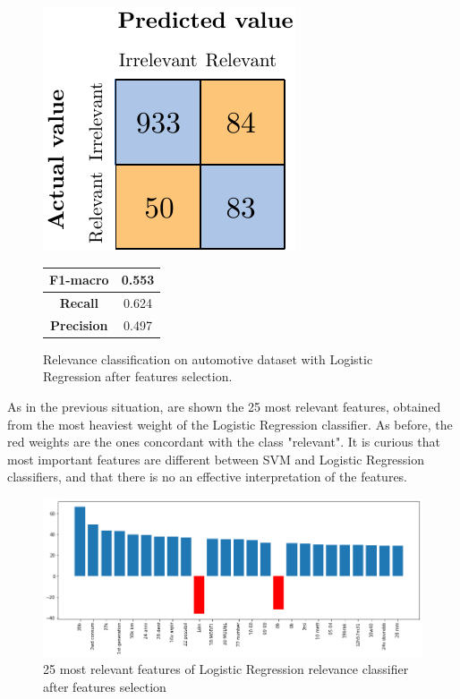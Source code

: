 \begin{figure}[H]
	\begin{minipage}[b]{0.6\linewidth}
		\centering
		\includegraphics[scale=1]{figures/conf_matrices/ita_rel_logreg/ita_rel_logreg_afs.pdf}
	\end{minipage}
	\begin{minipage}[b]{0.3\linewidth}
		\begin{tabular}[b]{ | c | c | } 
			\hline
			\textbf{F1-macro} & 0.553 \\
			\hline
			\textbf{Recall} & 0.624 \\ 
			\hline
			\textbf{Precision} & 0.497 \\ 
			\hline
		\end{tabular}
	\end{minipage}
	\caption{Relevance classification on automotive dataset with Logistic Regression after features selection.}
	\label{fig:ita_rel_logreg_afs}
\end{figure}

As in the previous situation, are shown the 25 most relevant features, obtained from the most heaviest weight of the Logistic Regression classifier. As before, the red weights are the ones concordant with the class "relevant". It is curious that most important features are different between SVM and Logistic Regression classifiers, and that there is no an effective interpretation of the features.

\begin{figure}[H]
	\centering
	\includegraphics[width=\textwidth]{figures/conf_matrices/ita_rel_logreg/logreg_rel_best_feat.png}
	\caption{25 most relevant features of Logistic Regression relevance classifier after features selection}
	\label{fig:ita_rel_logreg_feat}
\end{figure}

